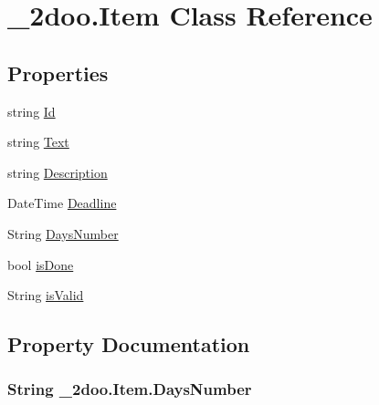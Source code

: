 \hypertarget{class__2doo_1_1_item}{
\section{\_\-2doo.Item Class Reference}
\label{class__2doo_1_1_item}
}
\subsection*{Properties}
\begin{CompactItemize}
\item 
string \hyperlink{class__2doo_1_1_item_33ebc749302aa7da3011adf3321a26e5}{Id}
\item 
string \hyperlink{class__2doo_1_1_item_60fcc3a7c4a46ba6bcc542822c627681}{Text}
\item 
string \hyperlink{class__2doo_1_1_item_322e34bb26422e389fdd179460a8a8b1}{Description}
\item 
DateTime \hyperlink{class__2doo_1_1_item_fc224b0c0007c3668f721c4b9f0260d2}{Deadline}
\item 
String \hyperlink{class__2doo_1_1_item_ac423434ba67e2fa834b6983e4a7ce13}{DaysNumber}
\item 
bool \hyperlink{class__2doo_1_1_item_9ecf450fba86ab3697223f48aca12ea4}{isDone}
\item 
String \hyperlink{class__2doo_1_1_item_c0cc447e1d78b9a5748e3646fcb81433}{isValid}
\end{CompactItemize}


\subsection{Property Documentation}
\hypertarget{class__2doo_1_1_item_ac423434ba67e2fa834b6983e4a7ce13}{
\subsubsection[{DaysNumber}]{\setlength{\rightskip}{0pt plus 5cm}String \_\-2doo.Item.DaysNumber}}
\label{class__2doo_1_1_item_ac423434ba67e2fa834b6983e4a7ce13}


